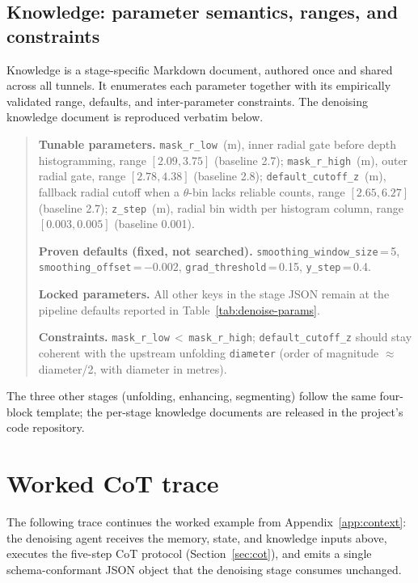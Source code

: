 \subsection{Knowledge: parameter semantics, ranges, and constraints}\label{app:context-knowledge}
Knowledge is a stage-specific Markdown document, authored once and shared across all tunnels. It enumerates each parameter together with its empirically validated range, defaults, and inter-parameter constraints. The denoising knowledge document is reproduced verbatim below.

\begin{quote}\small
\textbf{Tunable parameters.}
\texttt{mask\_r\_low}~(m), inner radial gate before depth histogramming, range $[2.09, 3.75]$ (baseline 2.7);
\texttt{mask\_r\_high}~(m), outer radial gate, range $[2.78, 4.38]$ (baseline 2.8);
\texttt{default\_cutoff\_z}~(m), fallback radial cutoff when a $\theta$-bin lacks reliable counts, range $[2.65, 6.27]$ (baseline 2.7);
\texttt{z\_step}~(m), radial bin width per histogram column, range $[0.003, 0.005]$ (baseline 0.001).

\textbf{Proven defaults (fixed, not searched).}
\texttt{smoothing\_window\_size}\,=\,5,
\texttt{smoothing\_offset}\,=\,$-0.002$,
\texttt{grad\_threshold}\,=\,0.15,
\texttt{y\_step}\,=\,0.4.

\textbf{Locked parameters.} All other keys in the stage JSON remain at the pipeline defaults reported in Table~\ref{tab:denoise-params}.

\textbf{Constraints.}
\texttt{mask\_r\_low}\,$<$\,\texttt{mask\_r\_high};
\texttt{default\_cutoff\_z} should stay coherent with the upstream unfolding \texttt{diameter} (order of magnitude $\approx$ diameter/2, with diameter in metres).
\end{quote}

The three other stages (unfolding, enhancing, segmenting) follow the same four-block template; the per-stage knowledge documents are released in the project's code repository.

\section{Worked CoT trace}\label{app:cot}

The following trace continues the worked example from Appendix~\ref{app:context}: the denoising agent receives the memory, state, and knowledge inputs above, executes the five-step CoT protocol (Section~\ref{sec:cot}), and emits a single schema-conformant JSON object that the denoising stage consumes unchanged.

